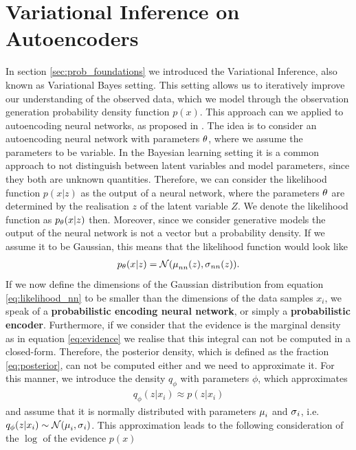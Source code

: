 \section{Variational Inference on Autoencoders}\label{sec:vi_on_ae}

In section \ref{sec:prob_foundations} we introduced the Variational Inference, also known as Variational Bayes setting. This setting allows us to iteratively improve our understanding of the observed data, which we model through the observation generation probability density function $p(x)$. This approach can we applied to autoencoding neural networks, as proposed in \cite{kingma2013auto}. The idea is to consider an autoencoding neural network with parameters $\theta$, where we assume the parameters to be variable. In the Bayesian learning setting it is a common approach to not distinguish between latent variables and model parameters, since they both are unknown quantities. Therefore, we can consider the likelihood function $p(x|z)$ as the output of a neural network, where the parameters $\theta$ are determined by the realisation $z$ of the latent variable $Z$. We denote the likelihood function as $p_\theta(x|z)$ then. Moreover, since we consider generative models the output of the neural network is not a vector but a probability density. If we assume it to be Gaussian, this means that the likelihood function would look like
\begin{align}\label{eq:likelihood_nn}
p_\theta(x|z) = \mathcal{N} (\operatorname{\mu}_{nn}(z), \operatorname{\sigma}_{nn}(z)).
\end{align}
If we now define the dimensions of the Gaussian distribution from equation \eqref{eq:likelihood_nn} to be smaller than the dimensions of the data samples $x_i$, we speak of a \textbf{probabilistic encoding neural network}, or simply a \textbf{probabilistic encoder}.  Furthermore, if we consider that the evidence is the marginal density as in equation \eqref{eq:evidence} we realise that this integral can not be computed in a closed-form. Therefore, the posterior density, which is defined as the fraction \eqref{eq:posterior}, can not be computed either and we need to approximate it. For this manner, we introduce the density $q_{\phi}$ with parameters $\phi$, which approximates
\begin{align*}
q_{\phi}(z|x_i) \approx p(z|x_i)
\end{align*}
and assume that it is normally distributed with parameters $\operatorname{\mu}_i$ and $\operatorname{\sigma}_i$, i.e. $q_{\phi}(z|x_i) \sim \mathcal{N} (\operatorname{\mu}_i, \operatorname{\sigma}_i)$. This approximation leads to the following consideration of the $\log$ of the evidence $p(x)$
